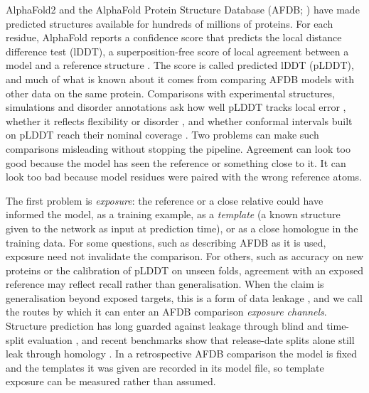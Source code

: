 \documentclass{article}
\begin{document}
AlphaFold2 \citep{jumper2021} and the AlphaFold Protein Structure Database
(AFDB; \citealp{varadi2022,bertoni2026}) have made predicted structures
available for hundreds of millions of proteins. For each residue, AlphaFold
reports a confidence score that predicts the local distance difference test
(lDDT), a superposition-free score of local agreement between a model and a
reference structure \citep{mariani2013}. The score is called predicted lDDT
(pLDDT), and much of what is known about it comes from comparing AFDB models
with other data on the same protein. Comparisons with experimental
structures, simulations and disorder annotations ask how well pLDDT tracks
local error \citep{jumper2021}, whether it reflects flexibility or disorder
\citep{akdel2022,ruff2021,guo2022,saldano2022,carugo2023}, and whether
conformal intervals built on pLDDT reach their nominal coverage
\citep{shihab2026calpro}. Two problems can make such comparisons misleading
without stopping the pipeline. Agreement can look too good because the model
has seen the reference or something close to it. It can look too bad because
model residues were paired with the wrong reference atoms.

The first problem is \emph{exposure}: the reference or a close relative
could have informed the model, as a training example, as a
\emph{template} (a known structure given to the network as input at
prediction time), or as a close homologue in the training data. For some
questions, such as describing AFDB as it is used, exposure need not invalidate the comparison.
For others, such as accuracy on new proteins or the calibration of pLDDT on
unseen folds, agreement with an exposed reference may reflect recall rather
than generalisation. When the claim is generalisation beyond exposed targets, this is a form of data leakage \citep{kaufman2012,kapoor2023},
and we call the routes by which it can enter an AFDB comparison
\emph{exposure channels}. Structure prediction has long guarded against
leakage through blind and time-split evaluation
\citep{kryshtafovych2021,haas2018,jumper2021}, and recent benchmarks show
that release-date splits alone still leak through homology
\citep{buttenschoen2024,durairaj2024,dobson2025beta,bushuiev2024}. In a
retrospective AFDB comparison the model is fixed and the templates it was given
are recorded in its model file, so template exposure can be measured rather than assumed.
\end{document}
